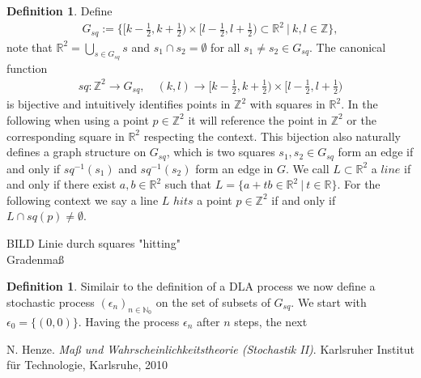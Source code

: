 \documentclass[12pt,a4paper]{scrartcl}
\numberwithin{equation}{section}
\numberwithin{equation}{section}%
\theoremstyle{definition}
\newtheorem{definition}[theorem]{Definition}
\theoremstyle{definition}
\begin{document}
\begin{definition}
	Define 
	\begin{align}
		G_{sq} := \{[k - \frac{1}{2}, k + \frac{1}{2}) \times [l- \frac{1}{2}, l + \frac{1}{2}) \subset \mathbb{R}^2\ |\ k,l \in \mathbb{Z}\}, 
	\end{align} 
	note that $\mathbb{R}^2 = \bigcup_{s\in G_{sq}} s$ and $s_1\cap s_2 = \emptyset$ for all $s_1\neq s_2\in G_{sq}$. The canonical function
	\begin{align}
	sq: \mathbb{Z}^2 \to G_{sq},\quad (k,l)\to [k - \frac{1}{2}, k + \frac{1}{2}) \times [l- \frac{1}{2}, l + \frac{1}{2})
	\end{align}
	is bijective and intuitively identifies points in $\mathbb{Z}^2$ with squares in $\mathbb{R}^2$. In the following when using a point $p\in \mathbb{Z}^2$ it will reference the point in $\mathbb{Z}^2$ or the corresponding square in $\mathbb{R}^2$ respecting the context. This bijection also naturally defines a graph structure on $G_{sq}$, which is two squares $s_1, s_2\in G_{sq}$ form an edge if and only if $sq^{-1}(s_1)$ and $sq^{-1}(s_2)$ form an edge in $G$. We call $L\subset \mathbb{R}^2$ a $line$ if and only if there exist $a,b\in \mathbb{R}^2$ such that $L=\{a+tb\in \mathbb{R}^2\ |\ t\in \mathbb{R}\}$. For the following context we say a line $L$ $hits$ a point $p\in \mathbb{Z}^2$ if and only if $L\cap sq(p) \neq \emptyset$.
	
\end{definition}

BILD Linie durch squares "hitting"\\
Gradenmaß

\begin{definition}
	Similair to the definition of a DLA process we now define a stochastic process $(\epsilon_n)_{n\in \mathbb{N}_0}$ on the set of subsets of $G_{sq}$. We start with $\epsilon_0 =  \{(0,0)\}$. Having the process $\epsilon_n$ after $n$ steps, the next  
\end{definition}




\newpage


\begin{thebibliography}{Lam00}
\thispagestyle{empty}

N. Henze.
\emph{Maß und Wahrscheinlichkeitstheorie (Stochastik II)}.
Karlsruher Institut für Technologie, Karlsruhe, 2010

\end{thebibliography}
\end{document}

